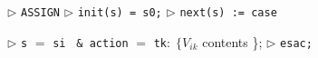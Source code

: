 \documentclass[a4paper]{article}
\begin{document}
\begin{algorithmic}

\State $\triangleright$ \verb!ASSIGN! 
\State $\triangleright$ \verb!init(s) = s0;! 
\State $\triangleright$ \verb!next(s) := case!

			\EndIf
		\EndFor
		\State $\triangleright$ \verb!s! $=$ \verb!si! \verb! & action! $=$ \verb!tk!$\colon \; \{V_{ik}$ contents \};
	\EndFor
\EndFor
\State $\triangleright$ \verb!esac;!

\end{algorithmic}
\end{document}
